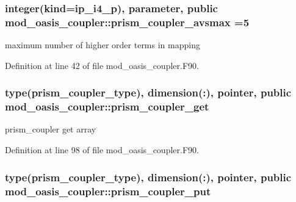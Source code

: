 \hypertarget{classmod__oasis__coupler_a6f166f099a134dffba97a168d28a3c01}{
\subsubsection[{prism\+\_\+coupler\+\_\+avsmax}]{\setlength{\rightskip}{0pt plus 5cm}integer(kind=ip\+\_\+i4\+\_\+p), parameter, public mod\+\_\+oasis\+\_\+coupler\+::prism\+\_\+coupler\+\_\+avsmax =5}}\label{classmod__oasis__coupler_a6f166f099a134dffba97a168d28a3c01}


maximum number of higher order terms in mapping 



Definition at line 42 of file mod\+\_\+oasis\+\_\+coupler.\+F90.

\hypertarget{classmod__oasis__coupler_a96df3ef2ec1b53597bb9beca43fe8349}{
\subsubsection[{prism\+\_\+coupler\+\_\+get}]{\setlength{\rightskip}{0pt plus 5cm}type({\bf prism\+\_\+coupler\+\_\+type}), dimension(\+:), pointer, public mod\+\_\+oasis\+\_\+coupler\+::prism\+\_\+coupler\+\_\+get}}\label{classmod__oasis__coupler_a96df3ef2ec1b53597bb9beca43fe8349}


prism\+\_\+coupler get array 



Definition at line 98 of file mod\+\_\+oasis\+\_\+coupler.\+F90.

\hypertarget{classmod__oasis__coupler_ae59d8823993d9ca8610efd9770393271}{
\subsubsection[{prism\+\_\+coupler\+\_\+put}]{\setlength{\rightskip}{0pt plus 5cm}type({\bf prism\+\_\+coupler\+\_\+type}), dimension(\+:), pointer, public mod\+\_\+oasis\+\_\+coupler\+::prism\+\_\+coupler\+\_\+put}}\label{classmod__oasis__coupler_ae59d8823993d9ca8610efd9770393271}


